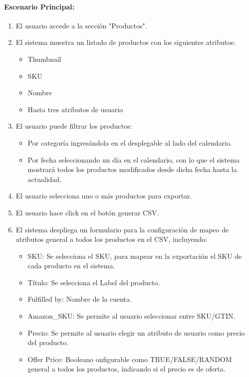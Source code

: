 \paragraph{Escenario Principal:}
\begin{enumerate}
    \item El usuario accede a la sección "Productos".
    \item El sistema muestra un listado de productos con los siguientes atributos:
    \begin{itemize}
        \item Thumbnail
        \item SKU
        \item Nombre
        \item Hasta tres atributos de usuario
    \end{itemize}
    \item El usuario puede filtrar los productos:
    \begin{itemize}
        \item Por categoría ingresándola en el desplegable al lado del calendario.
        \item Por fecha seleccionando un día en el calendario, con lo que el sistema mostrará todos los productos modificados desde dicha fecha hasta la actualidad.
    \end{itemize}  
    \item El usuario selecciona uno o más productos para exportar.
    \item El usuario hace click en el botón generar CSV.
    \item El sistema despliega un formulario para la configuración de mapeo de atributos general a todos los productos en el CSV, incluyendo:
    \begin{itemize}
        \item SKU: Se selecciona el SKU, para mapear en la exportación el SKU de cada producto en el sistema.
        \item Título: Se selecciona el Label del producto.
        \item Fulfilled by:  Nombre de la cuenta.
        \item Amazon\_SKU: Se permite al usuario seleccionar entre SKU/GTIN.
        \item Precio:  Se permite al usuario elegir un atributo de usuario como precio del producto.
        \item Offer Price: Booleano onfigurable como TRUE/FALSE/RANDOM general a todos los productos, indicando si el precio es de oferta.

\end{itemize}
\end{enumerate}
